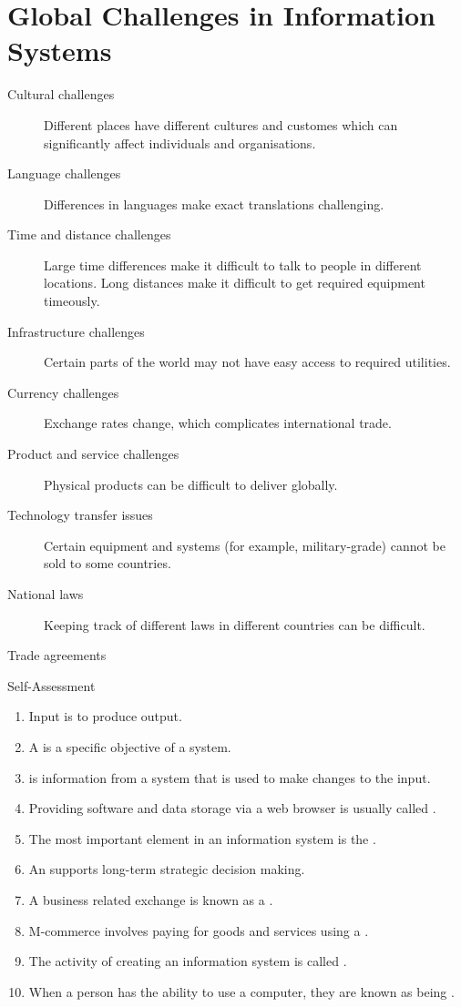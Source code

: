 \documentclass[\main/notes.tex]{subfiles}
\begin{document}
			\section{Global Challenges in Information Systems}
				\begin{description}
					\item[Cultural challenges] Different places have different cultures and customes which can significantly affect individuals and organisations. 
					\item[Language challenges] Differences in languages make exact translations challenging.
					\item[Time and distance challenges] Large time differences make it difficult to talk to people in different locations. Long distances make it difficult to get required equipment timeously.
					\item[Infrastructure challenges] Certain parts of the world may not have easy access to required utilities.
					\item[Currency challenges] Exchange rates change, which complicates international trade.
					\item[Product and service challenges] Physical products can be difficult to deliver globally.
					\item[Technology transfer issues] Certain equipment and systems (for example, military-grade) cannot be sold to some countries.
					\item[National laws] Keeping track of different laws in different countries can be difficult.
					\item[Trade agreements] 
				\end{description}
				\pagebreak
				\begin{exercise}{Self-Assessment}
					\begin{enumerate}
						\item Input is  to produce output.
						\item A  is a specific objective of a system.
						\item {} is information from a system that is used to make changes to the input.
						\item Providing software and data storage via a web browser is usually called .
						\item The most important element in an information system is the .
						\item An  supports long-term strategic decision making.
						\item A business related exchange is known as a .
						\item M-commerce involves paying for goods and services using a .
						\item The activity of creating an information system is called .
						\item When a person has the ability to use a computer, they are known as being .
					\end{enumerate}
				\end{exercise}
\end{document}
